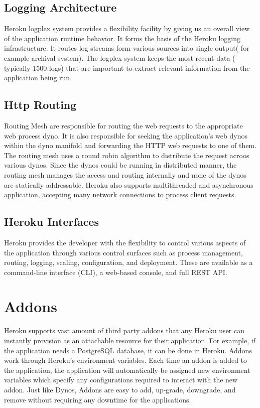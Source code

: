 \documentclass[9pt,twocolumn,twoside]{../../styles/osajnl}
\begin{document}
\subsection{Logging Architecture}
	Heroku logplex system provides a flexibility facility by giving us an overall
	view of the application runtime behavior. It forms the basis of the Heroku
	logging  infrastructure. It routes log streams form various sources into single
	output( for example archival system). The logplex system keeps the most recent
	data ( typically 1500 logs) that are important to extract relevant information
	from the application  being run.

\subsection{Http Routing}
	Routing Mesh are responsible for routing the web requests to the appropriate
	web process dyno. It is also responsible for seeking the application’s web dynos
	within the dyno manifold and forwarding the HTTP web requests to one of them.
	The routing mesh uses a round robin algorithm to distribute the request acroos
	various dynos. Since the dynos could be running in distributed manner, the
	routing mesh manages the access and routing internally and none of the dynos are
	statically addressable. Heroku also supports multithreaded and asynchronous
	application, accepting many network connections to process client requests.

\subsection{Heroku Interfaces}
	
	Heroku provides the developer with the flexibility to control various aspects 
	of the application through various control surfaces such as process management,
	routing, logging, scaling, configuration, and deployment. These are available 
	as a command-line interface (CLI), a web-based console, and full REST API.

\section{Addons}

	Heroku supports vast amount of third party addons\cite{Addons} that any Heroku
	user can instantly provision as an attachable resource for their application.
	For example, if the application needs a PostgreSQL\cite{PostgresSQL} database, 
	it can be done in Heroku. Addons work through Heroku’s environment variables. 
	Each time an addon is added to the application, the application will
	automatically be assigned new environment variables which specify any
	configurations required to interact with the new addon. Just like Dynos, Addons
	are easy to add, up-grade, downgrade, and remove without requiring any downtime
	for the applications.
\end{document}
